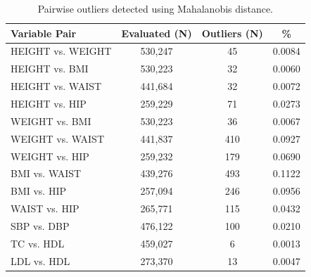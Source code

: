 \documentclass[12pt]{article}
\begin{document}
\begin{appendix}
\begin{refsection}
    \begin{table}[H]
        \centering
        \caption{Pairwise outliers detected using Mahalanobis distance.}
        \begin{tabular}{lccc}
            \toprule
            Variable Pair & Evaluated (N) & Outliers (N) & \% \\
            \midrule
            HEIGHT vs. WEIGHT & 530,247 & 45 & 0.0084\\
            HEIGHT vs. BMI & 530,223 & 32 & 0.0060\\
            HEIGHT vs. WAIST & 441,684 & 32 & 0.0072\\
            HEIGHT vs. HIP & 259,229 & 71 & 0.0273\\
            WEIGHT vs. BMI & 530,223 & 36 & 0.0067\\
            WEIGHT vs. WAIST & 441,837 & 410 & 0.0927\\
            WEIGHT vs. HIP & 259,232 & 179 & 0.0690\\
            BMI vs. WAIST & 439,276 & 493 & 0.1122\\
            BMI vs. HIP & 257,094 & 246 & 0.0956\\
            WAIST vs. HIP & 265,771 & 115 & 0.0432\\
            SBP vs. DBP & 476,122 & 100 & 0.0210\\
            TC vs. HDL & 459,027 & 6 & 0.0013\\
            LDL vs. HDL & 273,370 & 13 & 0.0047\\
            \bottomrule
            \end{tabular}
    \end{table}


\end{refsection}
\end{appendix}
\end{document}
